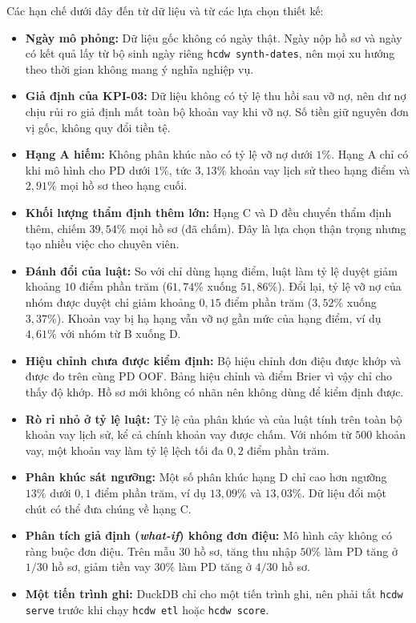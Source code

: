 Các hạn chế dưới đây đến từ dữ liệu và từ các lựa chọn thiết kế:
\begin{itemize}[topsep=0pt, itemsep=1pt]
	\item \textbf{Ngày mô phỏng:} Dữ liệu gốc không có ngày thật. Ngày nộp hồ sơ và ngày có kết quả lấy từ bộ sinh ngày riêng \texttt{hcdw synth-dates}, nên mọi xu hướng theo thời gian không mang ý nghĩa nghiệp vụ.
	\item \textbf{Giả định của KPI-03:} Dữ liệu không có tỷ lệ thu hồi sau vỡ nợ, nên dư nợ chịu rủi ro giả định mất toàn bộ khoản vay khi vỡ nợ. Số tiền giữ nguyên đơn vị gốc, không quy đổi tiền tệ.
	\item \textbf{Hạng A hiếm:} Không phân khúc nào có tỷ lệ vỡ nợ dưới $1\%$. Hạng A chỉ có khi mô hình cho PD dưới $1\%$, tức $3{,}13\%$ khoản vay lịch sử theo hạng điểm và $2{,}91\%$ mọi hồ sơ theo hạng cuối.
	\item \textbf{Khối lượng thẩm định thêm lớn:} Hạng C và D đều chuyển thẩm định thêm, chiếm $39{,}54\%$ mọi hồ sơ (đã chấm). Đây là lựa chọn thận trọng nhưng tạo nhiều việc cho chuyên viên.
	\item \textbf{Đánh đổi của luật:} So với chỉ dùng hạng điểm, luật làm tỷ lệ duyệt giảm khoảng $10$ điểm phần trăm ($61{,}74\%$ xuống $51{,}86\%$). Đổi lại, tỷ lệ vỡ nợ của nhóm được duyệt chỉ giảm khoảng $0{,}15$ điểm phần trăm ($3{,}52\%$ xuống $3{,}37\%$). Khoản vay bị hạ hạng vẫn vỡ nợ gần mức của hạng điểm, ví dụ $4{,}61\%$ với nhóm từ B xuống D.
	\item \textbf{Hiệu chỉnh chưa được kiểm định:} Bộ hiệu chỉnh đơn điệu được khớp và được đo trên cùng PD OOF. Bảng hiệu chỉnh và điểm Brier vì vậy chỉ cho thấy độ khớp. Hồ sơ mới không có nhãn nên không dùng để kiểm định được.
	\item \textbf{Rò rỉ nhỏ ở tỷ lệ luật:} Tỷ lệ của phân khúc và của luật tính trên toàn bộ khoản vay lịch sử, kể cả chính khoản vay được chấm. Với nhóm từ $500$ khoản vay, một khoản vay làm tỷ lệ lệch tối đa $0{,}2$ điểm phần trăm.
	\item \textbf{Phân khúc sát ngưỡng:} Một số phân khúc hạng D chỉ cao hơn ngưỡng $13\%$ dưới $0{,}1$ điểm phần trăm, ví dụ $13{,}09\%$ và $13{,}03\%$. Dữ liệu đổi một chút có thể đưa chúng về hạng C.
	\item \textbf{Phân tích giả định (\textit{what-if}) không đơn điệu:} Mô hình cây không có ràng buộc đơn điệu. Trên mẫu $30$ hồ sơ, tăng thu nhập $50\%$ làm PD tăng ở $1/30$ hồ sơ, giảm tiền vay $30\%$ làm PD tăng ở $4/30$ hồ sơ.
	\item \textbf{Một tiến trình ghi:} DuckDB chỉ cho một tiến trình ghi, nên phải tắt \texttt{hcdw serve} trước khi chạy \texttt{hcdw etl} hoặc \texttt{hcdw score}.
\end{itemize}

